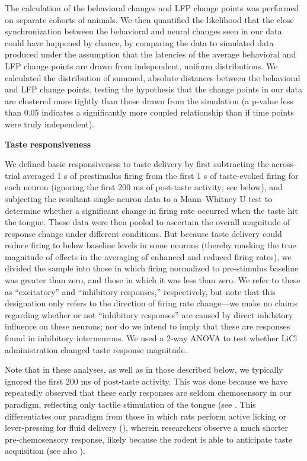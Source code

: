 \begin{refsection}
The calculation of the behavioral changes and LFP change points was performed on separate cohorts of animals. We then quantified the likelihood that the close synchronization between the behavioral and neural changes seen in our data could have happened by chance, by comparing the data to simulated data produced under the assumption that the latencies of the average behavioral and LFP change points are drawn from independent, uniform distributions. We calculated the distribution of summed, absolute distances between the behavioral and LFP change points, testing the hypothesis that the change points in our data are clustered more tightly than those drawn from the simulation (a p-value less than 0.05 indicates a significantly more coupled relationship than if time points were truly independent).

\smallskip
\noindent\textbf{Taste responsiveness}\par
\noindent 
We defined basic responsiveness to taste delivery by first subtracting the across-trial averaged 1 s of prestimulus firing from the first 1 s of taste-evoked firing for each neuron (ignoring the first 200 ms of post-taste activity; see below), and subjecting the resultant single-neuron data to a Mann–Whitney U test to determine whether a significant change in firing rate occurred when the taste hit the tongue. These data were then pooled to ascertain the overall magnitude of response change under different conditions. But because taste delivery could reduce firing to below baseline levels in some neurons (thereby masking the true magnitude of effects in the averaging of enhanced and reduced firing rates), we divided the sample into those in which firing normalized to pre-stimulus baseline was greater than zero, and those in which it was less than zero. We refer to these as “excitatory” and “inhibitory responses,” respectively, but note that this designation only refers to the direction of firing rate change—we make no claims regarding whether or not “inhibitory responses” are caused by direct inhibitory influence on these neurons; nor do we intend to imply that these are responses found in inhibitory interneurons. We used a 2-way ANOVA to test whether LiCl administration changed taste response magnitude.

Note that in these analyses, as well as in those described below, we typically ignored the first 200 ms of post-taste activity. This was done because we have repeatedly observed that these early responses are seldom chemosensory in our paradigm, reflecting only tactile stimulation of the tongue (see \cite{fontanini2006a,katz-a,katz2001a,sadacca2016a,sadacca2012a,jones2007a}. This differentiates our paradigm from those in which rats perform active licking or lever-pressing for fluid delivery (\cite{gutierrez2010a,stapleton2006a,graham2014a,bouaichi2020a,dikecligil2020a}), wherein researchers observe a much shorter pre-chemosensory response, likely because the rodent is able to anticipate taste acquisition (see also \cite{li2016a}).


\end{refsection}
